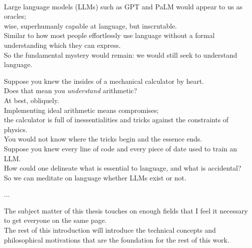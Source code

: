 \begin{fullwidth}
\begin{centering}
\\
Large language models (LLMs) such as GPT and PaLM would appear to us as oracles;\\
wise, superhumanly capable at language, but inscrutable.\\
Similar to how most people effortlessly use language without a formal understanding which they can express.\\
So the fundamental mystery would remain: we would still seek to understand language.

Suppose you knew the insides of a mechanical calculator by heart.\\
Does that mean you \emph{understand} arithmetic?\\
At best, obliquely.\\
Implementing ideal arithmetic means compromises;\\
the calculator is full of inessentialities and tricks against the constraints of physics.\\
You would not know where the tricks begin and the essence ends.\\
Suppose you knew every line of code and every piece of date used to train an LLM.\\
How could one delineate what is essential to language, and what is accidental?\\
So we can meditate on language whether LLMs exist or not.

\newthought{}
...


The subject matter of this thesis touches on enough fields that I feel it necessary to get everyone on the same page.\\
The rest of this introduction will introduce the technical concepts and philosophical motivations that are the foundation for the rest of this work.

\end{centering}
\end{fullwidth}